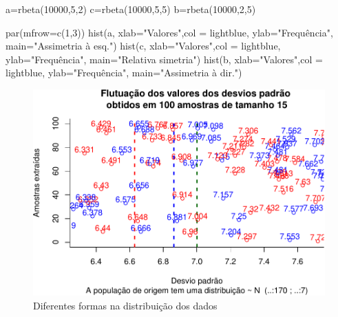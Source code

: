 \documentclass[
]{book}
\newenvironment{Shaded}{\begin{snugshade}}{\end{snugshade}}
\newcommand{\AttributeTok}[1]{\textcolor[rgb]{0.77,0.63,0.00}{#1}}
\newcommand{\DecValTok}[1]{\textcolor[rgb]{0.00,0.00,0.81}{#1}}
\newcommand{\FunctionTok}[1]{\textcolor[rgb]{0.00,0.00,0.00}{#1}}
\newcommand{\NormalTok}[1]{#1}
\newcommand{\OtherTok}[1]{\textcolor[rgb]{0.56,0.35,0.01}{#1}}
\newcommand{\StringTok}[1]{\textcolor[rgb]{0.31,0.60,0.02}{#1}}
\begin{document}
\begin{Shaded}
\begin{Highlighting}[]
\NormalTok{a}\OtherTok{=}\FunctionTok{rbeta}\NormalTok{(}\DecValTok{10000}\NormalTok{,}\DecValTok{5}\NormalTok{,}\DecValTok{2}\NormalTok{)}
\NormalTok{c}\OtherTok{=}\FunctionTok{rbeta}\NormalTok{(}\DecValTok{10000}\NormalTok{,}\DecValTok{5}\NormalTok{,}\DecValTok{5}\NormalTok{)}
\NormalTok{b}\OtherTok{=}\FunctionTok{rbeta}\NormalTok{(}\DecValTok{10000}\NormalTok{,}\DecValTok{2}\NormalTok{,}\DecValTok{5}\NormalTok{)}

\FunctionTok{par}\NormalTok{(}\AttributeTok{mfrow=}\FunctionTok{c}\NormalTok{(}\DecValTok{1}\NormalTok{,}\DecValTok{3}\NormalTok{))}
\FunctionTok{hist}\NormalTok{(a, }
     \AttributeTok{xlab=}\StringTok{"Valores"}\NormalTok{,}\AttributeTok{col =} \StringTok{\textquotesingle{}lightblue\textquotesingle{}}\NormalTok{,}
     \AttributeTok{ylab=}\StringTok{"Frequência"}\NormalTok{,}
     \AttributeTok{main=}\StringTok{"Assimetria à esq."}\NormalTok{)}
\FunctionTok{hist}\NormalTok{(c, }
     \AttributeTok{xlab=}\StringTok{"Valores"}\NormalTok{,}\AttributeTok{col =} \StringTok{\textquotesingle{}lightblue\textquotesingle{}}\NormalTok{,}
     \AttributeTok{ylab=}\StringTok{"Frequência"}\NormalTok{,}
     \AttributeTok{main=}\StringTok{"Relativa simetria"}\NormalTok{)}
\FunctionTok{hist}\NormalTok{(b, }
     \AttributeTok{xlab=}\StringTok{"Valores"}\NormalTok{,}\AttributeTok{col =} \StringTok{\textquotesingle{}lightblue\textquotesingle{}}\NormalTok{,}
     \AttributeTok{ylab=}\StringTok{"Frequência"}\NormalTok{,}
     \AttributeTok{main=}\StringTok{"Assimetria à dir."}\NormalTok{)}
\end{Highlighting}
\end{Shaded}

\begin{figure}

{\centering \includegraphics[width=0.8\linewidth]{apostila_files/figure-latex/unnamed-chunk-37-1} 

}

\caption{Diferentes formas na distribuição dos dados}\label{fig:unnamed-chunk-37}
\end{figure}
\end{document}
